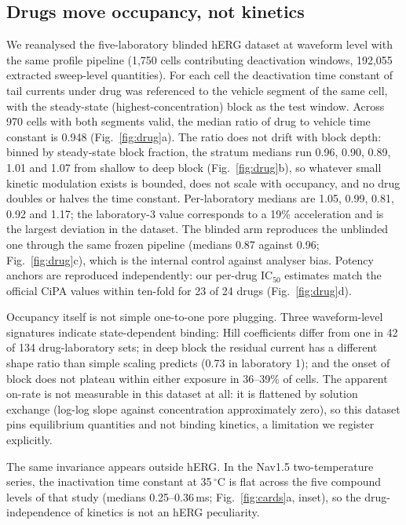 \documentclass[11pt,a4paper]{article}
\begin{document}
\subsection{Drugs move occupancy, not kinetics}

We reanalysed the five-laboratory blinded hERG dataset at waveform level with the
same profile pipeline (1,750 cells contributing deactivation windows, 192,055
extracted sweep-level quantities).
For each cell the deactivation time constant of tail currents under drug was
referenced to the vehicle segment of the same cell, with the steady-state
(highest-concentration) block as the test window. Across 970 cells with both
segments valid, the median ratio of drug to vehicle time constant is 0.948
(Fig.~\ref{fig:drug}a). The ratio does not drift with block depth: binned by
steady-state block fraction, the stratum medians run 0.96, 0.90, 0.89, 1.01 and
1.07 from shallow to deep block (Fig.~\ref{fig:drug}b), so whatever small kinetic
modulation exists is bounded, does not scale with occupancy, and no drug doubles
or halves the time constant. Per-laboratory medians are 1.05, 0.99, 0.81, 0.92
and 1.17; the laboratory-3 value corresponds to a 19\% acceleration and is the
largest deviation in the dataset. The blinded arm reproduces the unblinded one
through the same frozen pipeline (medians 0.87 against 0.96;
Fig.~\ref{fig:drug}c), which is the internal control against analyser bias.
Potency anchors are reproduced independently: our per-drug IC$_{50}$ estimates
match the official CiPA values within ten-fold for 23 of 24 drugs
(Fig.~\ref{fig:drug}d).

Occupancy itself is not simple one-to-one pore plugging. Three waveform-level
signatures indicate state-dependent binding: Hill coefficients differ from one in
42 of 134 drug-laboratory sets; in deep block the residual current has a
different shape ratio than simple scaling predicts (0.73 in laboratory 1); and
the onset of block does not plateau within either exposure in 36--39\% of cells.
The apparent on-rate is not measurable in this dataset at all: it is flattened by
solution exchange (log-log slope against concentration approximately zero), so
this dataset pins equilibrium quantities and not binding kinetics, a limitation
we register explicitly.

The same invariance appears outside hERG. In the Nav1.5 two-temperature series,
the inactivation time constant at 35\,$^\circ$C is flat across the five
compound levels of that study (medians 0.25--0.36\,ms; Fig.~\ref{fig:cards}a,
inset), so the drug-independence of kinetics is not an hERG peculiarity.
\end{document}
